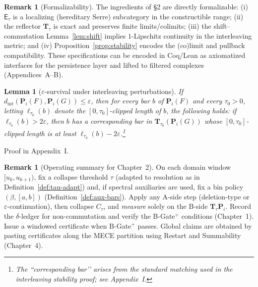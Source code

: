 \documentclass[11pt]{article}
\numberwithin{equation}{section}
\newtheorem{lemma}[theorem]{Lemma}
\theoremstyle{definition}
\newtheorem{remark}[theorem]{Remark}
\begin{document}
\begin{remark}[Formalizability]
The ingredients of §2 are directly formalizable: (i) \(\mathsf{E}_\tau\) is a localizing (hereditary Serre) subcategory in the constructible range; (ii) the reflector \(\mathbf{T}_\tau\) is exact and preserves finite limits/colimits; (iii) the shift–commutation Lemma~\ref{lem:shift} implies \(1\)-Lipschitz continuity in the interleaving metric; and (iv) Proposition~\ref{prop:stability} encodes the (co)limit and pullback compatibility. These specifications can be encoded in Coq/Lean as axiomatized interfaces for the persistence layer and lifted to filtered complexes (Appendices~A–B).
\end{remark}

\begin{lemma}[\texorpdfstring{$\varepsilon$}{\(\varepsilon\)}-survival under interleaving perturbations]
If \(d_{\mathrm{int}}(\mathbf{P}_i(F),\mathbf{P}_i(G))\le \varepsilon\), then for every bar \(b\) of \(\mathbf{P}_i(F)\)
and every \(\tau_0>0\), letting \(\ell_{\tau_0}(b)\) denote the \([0,\tau_0]\)-clipped length of \(b\), the following holds:
if \(\ell_{\tau_0}(b)>2\varepsilon\), then \(b\) has a corresponding bar in \(\mathbf{T}_{\tau_0}(\mathbf{P}_i(G))\)
whose \([0,\tau_0]\)-clipped length is at least \(\ell_{\tau_0}(b)-2\varepsilon\).\footnote{The “corresponding bar’’ arises from the standard matching used in the interleaving stability proof; see Appendix~I.}
\end{lemma}
\noindent Proof in Appendix~I.

\begin{remark}[Operating summary for Chapter~2]\label{rem:ch2-summary}
On each domain window \([u_k,u_{k+1})\), fix a collapse threshold \(\tau\) (adapted to resolution as in Definition~\ref{def:tau-adapt}) and, if spectral auxiliaries are used, fix a bin policy \((\beta,[a,b])\) (Definition~\ref{def:aux-bars}). Apply any A-side step (deletion-type or \(\varepsilon\)-continuation), then collapse \(C_\tau\), and \emph{measure} solely on the B-side \(\mathbf{T}_\tau\mathbf{P}_i\). Record the \(\delta\)-ledger for non-commutation and verify the B-Gate\(^{+}\) conditions (Chapter~1). Issue a windowed certificate when B-Gate\(^{+}\) passes. Global claims are obtained by pasting certificates along the MECE partition using Restart and Summability (Chapter~4).
\end{remark}



\end{document}
